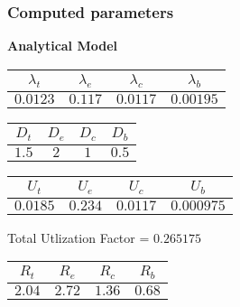 \documentclass{article}
\begin{document}
\subsubsection{Computed parameters}
\begin{minipage}{0.5\textwidth}
\centering	\textbf{Analytical Model}
\begin{table}[H]
\centering
\begin{tabular}{@{}cccc@{}}
\toprule
$\lambda_t$ & $\lambda_e$ & $\lambda_c$ & $\lambda_b$\\
\midrule
$0.0123$ & $0.117$ & $0.0117$ & $0.00195$\\
\bottomrule
\end{tabular}
\end{table}\begin{table}[H]
\centering
\begin{tabular}{@{}cccc@{}}
\toprule
$D_t$ & $D_e$ & $D_c$ & $D_b$\\
\midrule
$1.5$ & $2$ & $1$ & $0.5$\\
\bottomrule
\end{tabular}
\end{table}\begin{table}[H]
\centering
\begin{tabular}{@{}cccc@{}}
\toprule
$U_t$ & $U_e$ & $U_c$ & $U_b$\\
\midrule
$0.0185$ & $0.234$ & $0.0117$ & $0.000975$\\
\bottomrule
\end{tabular}
\end{table}
\centering Total Utlization Factor = $0.265175$
\begin{table}[H]
\centering
\begin{tabular}{@{}cccc@{}}
\toprule
$R_t$ & $R_e$ & $R_c$ & $R_b$\\
\midrule
$2.04$ & $2.72$ & $1.36$ & $0.68$\\
\bottomrule
\end{tabular}
\end{table}
\end{minipage}
\end{document}
